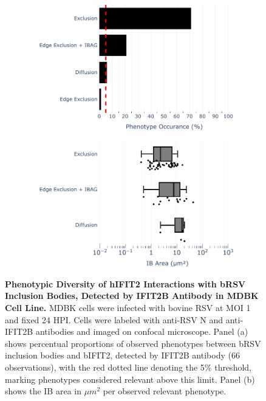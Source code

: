 \begin{figure}
    \begin{subfigure}{0.495\textwidth}
        \caption{}
        \includegraphics[width=1\linewidth]{08. Chapter 3/Figs/02. Infection/02. IFIT2/02. IFIT2B/10. bar_i2b_mdbk.pdf} 
    \end{subfigure}
    \begin{subfigure}{0.495\textwidth}
        \caption{}
        \includegraphics[width=1\linewidth]{08. Chapter 3/Figs/02. Infection/02. IFIT2/02. IFIT2B/11. box_i2b_mdbk.pdf}
    \end{subfigure}
    \caption[Phenotypic Diversity of hIFIT2 Interactions with bRSV Inclusion Bodies, Detected by IFIT2B Antibody in MDBK Cell Line.]{\textbf{Phenotypic Diversity of hIFIT2 Interactions with bRSV Inclusion Bodies, Detected by IFIT2B Antibody in MDBK Cell Line.} MDBK cells were infected with bovine RSV at MOI 1 and fixed 24 HPI. Cells were labeled with anti-RSV N and anti-IFIT2B antibodies and imaged on confocal microscope. Panel (a) shows percentual proportions of observed phenotypes between bRSV inclusion bodies and bIFIT2, detected by IFIT2B antibody (66 observations), with the red dotted line denoting the 5\% threshold, marking phenotypes considered relevant above this limit. Panel (b) shows the IB area in \(\mu m^2\) per observed relevant phenotype.}
    \label{fig:Phenotypic Diversity of hIFIT2 Interactions with bRSV Inclusion Bodies, Detected by IFIT2B Antibody in MDBK Cell Line}
\end{figure}

